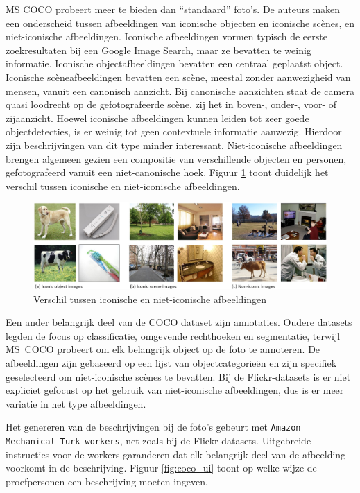 MS COCO probeert meer te bieden dan ``standaard'' foto's. De auteurs maken een onderscheid tussen afbeeldingen van iconische objecten en iconische sc\`enes, en niet-iconische afbeeldingen. Iconische afbeeldingen vormen typisch de eerste zoekresultaten bij een Google Image Search, maar ze bevatten te weinig informatie. Iconische objectafbeeldingen bevatten een centraal geplaatst object. Iconische sc\`eneafbeeldingen bevatten een sc\`ene, meestal zonder aanwezigheid van mensen, vanuit een canonisch aanzicht. Bij canonische aanzichten staat de camera quasi loodrecht op de gefotografeerde sc\`ene, zij het in boven-, onder-, voor- of zijaanzicht. Hoewel iconische afbeeldingen kunnen leiden tot zeer goede objectdetecties, is er weinig tot geen contextuele informatie aanwezig. Hierdoor zijn beschrijvingen van dit type minder interessant.  Niet-iconische afbeeldingen brengen algemeen gezien een compositie van verschillende objecten en personen, gefotografeerd vanuit een niet-canonische hoek. Figuur \ref{fig:cocotypes} toont duidelijk het verschil tussen iconische en niet-iconische afbeeldingen.

\begin{figure}[tb]
    \centering
    \includegraphics[width=\linewidth]{Images/iconic.jpg}
    \caption{Verschil tussen iconische en niet-iconische afbeeldingen\cite{Lin2014}}
    \label{fig:cocotypes}
\end{figure}

Een ander belangrijk deel van de COCO dataset zijn annotaties. Oudere datasets legden de focus op classificatie, omgevende rechthoeken en segmentatie, terwijl \mbox{MS COCO} probeert om elk belangrijk object op de foto te annoteren. De afbeeldingen zijn gebaseerd op een lijst van objectcategorie\"en en zijn specifiek geselecteerd om niet-iconische sc\`enes te bevatten. Bij de Flickr-datasets is er niet expliciet gefocust op het gebruik van niet-iconische afbeeldingen, dus is er meer variatie in het type afbeeldingen.


Het genereren van de beschrijvingen bij de foto's gebeurt met \texttt{Amazon Mechanical Turk workers}, net zoals bij de Flickr datasets. Uitgebreide instructies voor de workers garanderen dat elk belangrijk deel van de afbeelding voorkomt in de beschrijving\cite{Rampf2015}. Figuur \ref{fig:coco_ui} toont op welke wijze de proefpersonen een beschrijving moeten ingeven.


